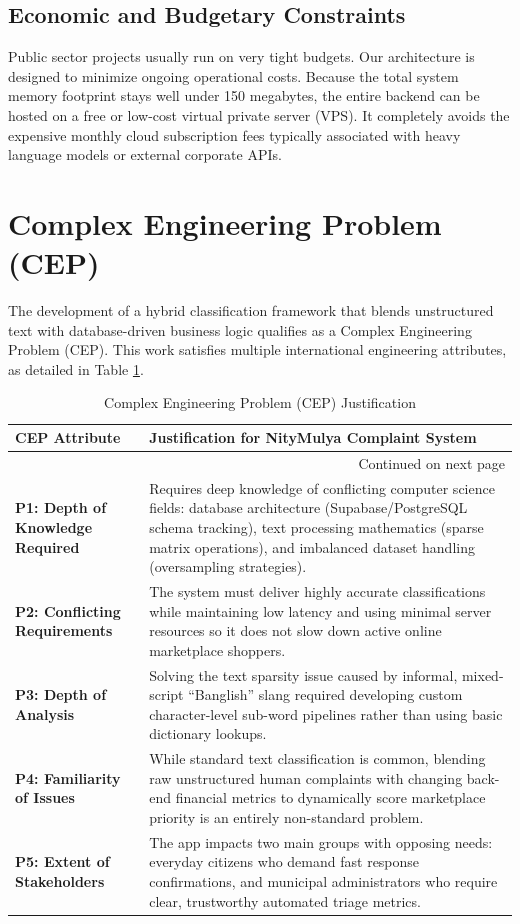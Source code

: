 \documentclass[12pt,a4paper,openany]{book}
\begin{document}
\subsection{Economic and Budgetary Constraints}
Public sector projects usually run on very tight budgets. Our architecture is designed to minimize ongoing operational costs. Because the total system memory footprint stays well under 150 megabytes, the entire backend can be hosted on a free or low-cost virtual private server (VPS). It completely avoids the expensive monthly cloud subscription fees typically associated with heavy language models or external corporate APIs.

\section{Complex Engineering Problem (CEP)}
The development of a hybrid classification framework that blends unstructured text with database-driven business logic qualifies as a Complex Engineering Problem (CEP). This work satisfies multiple international engineering attributes, as detailed in Table \ref{tab:cep_justification}.

\begin{longtable}{p{} p{}}
\caption{Complex Engineering Problem (CEP) Justification} \label{tab:cep_justification} \\
\toprule
\textbf{CEP Attribute} & \textbf{Justification for NityMulya Complaint System} \\
\midrule
\endhead
\bottomrule
\multicolumn{2}{r}{Continued on next page} \\
\endfoot
\bottomrule
\endlastfoot
\textbf{P1: Depth of Knowledge Required} & Requires deep knowledge of conflicting computer science fields: database architecture (Supabase/PostgreSQL schema tracking), text processing mathematics (sparse matrix operations), and imbalanced dataset handling (oversampling strategies). \\
\addlinespace
\textbf{P2: Conflicting Requirements} & The system must deliver highly accurate classifications while maintaining low latency and using minimal server resources so it does not slow down active online marketplace shoppers. \\
\addlinespace
\textbf{P3: Depth of Analysis} & Solving the text sparsity issue caused by informal, mixed-script ``Banglish'' slang required developing custom character-level sub-word pipelines rather than using basic dictionary lookups. \\
\addlinespace
\textbf{P4: Familiarity of Issues} & While standard text classification is common, blending raw unstructured human complaints with changing back-end financial metrics to dynamically score marketplace priority is an entirely non-standard problem. \\
\addlinespace
\textbf{P5: Extent of Stakeholders} & The app impacts two main groups with opposing needs: everyday citizens who demand fast response confirmations, and municipal administrators who require clear, trustworthy automated triage metrics. \\
\end{longtable}
\end{document}
